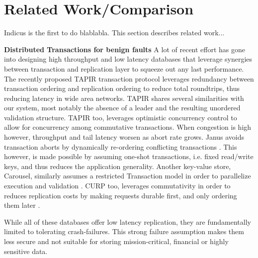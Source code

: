 
\section{Related Work/Comparison}  
Indicus is the first to do blablabla. This section describes related work...

\textbf{Distributed Transactions for benign faults}
A lot of recent effort has gone into designing high throughput and low latency databases that leverage synergies between transaction and replication layer to squeeze out any last performance. The recently proposed TAPIR transaction protocol leverages redundancy between transaction ordering and replication ordering to reduce total roundtrips, thus reducing latency in wide area networks. TAPIR shares several similarities with our system, most notably the absence of a leader and the resulting unordered validation structure. TAPIR too, leverages optimistic concurrency control to allow for concurrency among commutative transactions. When congestion is high however, throughput and tail latency worsen as abort rate grows. Janus avoids transaction aborts by dynamically re-ordering conflicting transactions \cite{mu2016consolidating}. This however, is made possible by assuming one-shot transactions, i.e. fixed read/write keys, and thus reduces the application generality. Another key-value store, Carousel, similarly assumes a restricted Transaction model in order to parallelize execution and validation \cite{yan2018carousel}. CURP too, leverages commutativity in order to reduces replication costs by making requests durable first, and only ordering them later \cite{park2019exploiting}. 

While all of these databases offer low latency replication, they are fundamentally limited to tolerating crash-failures. This strong failure assumption makes them less secure and not suitable for storing mission-critical, financial or highly sensitive data.

